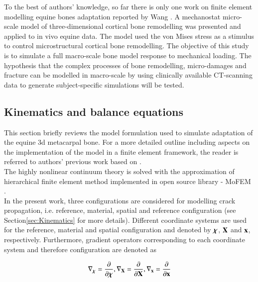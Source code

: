 \documentclass[11pt]{acmeArticle}
\numberwithin{equation}{section}
\begin{document}
To the best of authors' knowledge, so far there is only one work on finite element modelling equine bones adaptation reported by Wang \citep{Wang2016}. A mechanostat micro-scale model of three-dimensional cortical bone remodelling was presented and applied to in vivo equine data. The model used the von Mises stress as a stimulus to control microstructural cortical bone remodelling. 
The objective of this study is to simulate a full macro-scale bone model response to mechanical loading. The hypothesis that the complex processes of bone remodelling, micro-damages and fracture can be modelled in macro-scale by using clinically available CT-scanning data to generate subject-specific simulations will be tested. %
\subsection{Kinematics and balance equations}
This section briefly reviews the model formulation used to simulate  adaptation of the equine 3d metacarpal bone. For a more detailed outline including aspects on the implementation of the model in a finite element framework, the reader is referred to authors' previous work \cite{lewandowski2017} based on 
\citep{kuhl2003computational}.\\
The highly nonlinear continuum theory is solved with the approximation of hierarchical finite element method implemented in open source library - MoFEM \citep{mofem2017}.  \\

In the present work, three configurations are considered for modelling crack propagation, i.e. reference, material, spatial and reference configuration (see Section\ref{sec:Kinematics} for more details).
Different coordinate systems are used for the reference, material and spatial configuration and denoted by $\boldsymbol {\rm \chi}$, $\boldsymbol {\rm X}$ and $\boldsymbol {\rm x}$, respectively. 
Furthermore, gradient operators corresponding to each coordinate system and therefore configuration are denoted as

\begin{equation}
\nabla_{\boldsymbol {\rm \chi}} = \dfrac{\partial}{\partial \boldsymbol {\rm \chi}}, \nabla_{\boldsymbol {\rm X}} = \dfrac{\partial}{\partial \boldsymbol {\rm X}}, \nabla_{\boldsymbol {\rm x}} = \dfrac{\partial}{\partial \boldsymbol {\rm x}}
\label{eq:gradients}
\end{equation}
\end{document}
